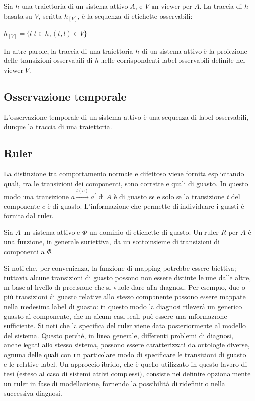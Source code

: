 \begin{defn}
Sia $h$ una traiettoria di un sistema attivo $A$, e $V$ un viewer per $A$. La traccia di $h$ basata su $V$, scritta $h_{[V]}$, è la sequenza di etichette osservabili:
\begin{center}
$h_{[V]} = \{l|t \in h, (t,l) \in V\}$
\end{center}
\end{defn}
In altre parole, la traccia di una traiettoria $h$ di un sistema attivo è la proiezione delle transizioni osservabili di $h$ nelle corrispondenti label osservabili definite nel viewer $V$.

\subsection{Osservazione temporale}
L'osservazione temporale di un sistema attivo è una sequenza di label osservabili, dunque la traccia di una traiettoria. 

\subsection{Ruler}
La distinzione tra comportamento normale e difettoso viene fornita esplicitando quali, tra le transizioni dei componenti, sono corrette e quali di guasto. In questo modo una transizione $a \xrightarrow{t(c)} a^\prime$ di $A$ è di guasto se e solo se la transizione $t$ del componente $c$ è di guasto.
L'informazione che permette di individuare i guasti è fornita dal ruler.
\begin{defn}
Sia $A$ un sistema attivo e $\Phi$ un dominio di etichette di guasto. Un ruler $R$ per $A$ è una funzione, in generale suriettiva, da un sottoinsieme di transizioni di componenti a $\Phi$.
\end{defn}
Si noti che, per convenienza, la funzione di mapping potrebbe essere biettiva; tuttavia alcune transizioni di guasto possono non essere distinte le une dalle altre, in base al livello di precisione che si vuole dare alla diagnosi. Per esempio, due o più transizioni di guasto relative allo stesso componente possono essere mappate nella medesima label di guasto: in questo modo la diagnosi rileverà un generico guasto al componente, che in alcuni casi reali può essere una informazione sufficiente.
Si noti che la specifica del ruler viene data posteriormente al modello del sistema. Questo perché, in linea generale, differenti problemi di diagnosi, anche legati allo stesso sistema, possono essere caratterizzati da ontologie diverse, ognuna delle quali con un particolare modo di specificare le transizioni di guasto e le relative label. Un approccio ibrido, che è quello utilizzato in questo lavoro di tesi (esteso al caso di sistemi attivi complessi), consiste nel definire opzionalmente un ruler in fase di modellazione, fornendo la possibilità di ridefinirlo nella successiva diagnosi.

